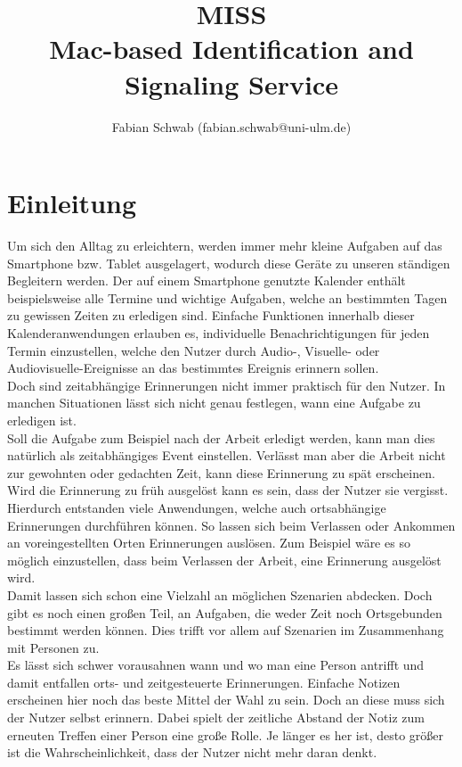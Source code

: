 \documentclass[]{report}
\title{MISS \\ Mac-based Identification and Signaling Service}
\author{Fabian Schwab (fabian.schwab@uni-ulm.de)}
\begin{document}
\maketitle

\chapter{Einleitung}
Um sich den Alltag zu erleichtern, werden immer mehr kleine Aufgaben auf das Smartphone bzw. Tablet ausgelagert, wodurch diese Geräte zu unseren ständigen Begleitern werden. Der auf einem Smartphone genutzte Kalender enthält beispielsweise alle Termine und wichtige Aufgaben, welche an bestimmten Tagen zu gewissen Zeiten zu erledigen sind. Einfache Funktionen innerhalb dieser Kalenderanwendungen erlauben es, individuelle Benachrichtigungen für jeden Termin einzustellen, welche den Nutzer durch Audio-, Visuelle- oder Audiovisuelle-Ereignisse an das bestimmtes Ereignis erinnern sollen.\\
Doch sind zeitabhängige Erinnerungen nicht immer praktisch für den Nutzer. In manchen Situationen lässt sich nicht genau festlegen, wann eine Aufgabe zu erledigen ist.\\
Soll die Aufgabe zum Beispiel nach der Arbeit erledigt werden, kann man dies natürlich als zeitabhängiges Event einstellen. Verlässt man aber die Arbeit nicht zur gewohnten oder gedachten Zeit, kann diese Erinnerung zu spät erscheinen. Wird die Erinnerung zu früh ausgelöst kann es sein, dass der Nutzer sie vergisst. \\
Hierdurch entstanden viele Anwendungen, welche auch ortsabhängige Erinnerungen durchführen können. So lassen sich beim Verlassen oder Ankommen an voreingestellten Orten Erinnerungen auslösen. Zum Beispiel wäre es so möglich einzustellen, dass beim Verlassen der Arbeit, eine Erinnerung ausgelöst wird. \\
Damit lassen sich schon eine Vielzahl an möglichen Szenarien abdecken. Doch gibt es noch einen großen Teil, an Aufgaben, die weder Zeit noch Ortsgebunden bestimmt werden können. Dies trifft vor allem auf Szenarien im Zusammenhang mit Personen zu. \\
Es lässt sich schwer vorausahnen wann und wo man eine Person antrifft und damit entfallen orts- und zeitgesteuerte Erinnerungen. Einfache Notizen erscheinen hier noch das beste Mittel der Wahl zu sein. Doch an diese muss sich der Nutzer selbst erinnern. Dabei spielt der zeitliche Abstand der Notiz zum erneuten Treffen einer Person eine große Rolle. Je länger es her ist, desto größer ist die Wahrscheinlichkeit, dass der Nutzer nicht mehr daran denkt. \\
\end{document}

